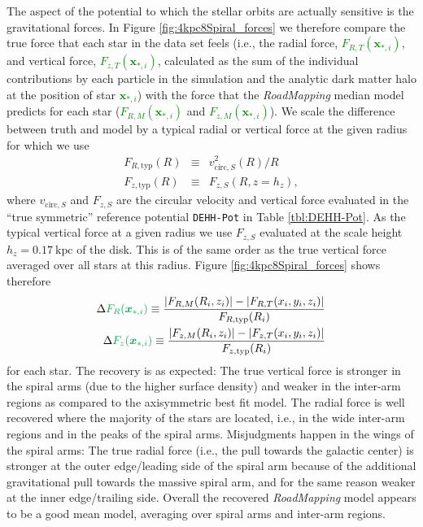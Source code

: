 \documentclass[iop,revtex4,numberedappendix,appendixfloats]{emulateapj}
\newcommand{\vect}[1]{\boldsymbol{#1}}
\newcommand{\RM}{{\sl RoadMapping}}
\newcommand{\NEW}[1]{\textcolor{Green}{#1}}
\newcommand{\OLD}[1]{}
\begin{document}
The aspect of the potential to which the stellar orbits are actually sensitive is the gravitational forces. In Figure \ref{fig:4kpc8Spiral_forces} we therefore compare the true force that each star in the data set feels (i.e., the radial force, \OLD{$F_{R,T}(*_i)$}\NEW{$F_{R,T}(\vect{x}_{*,i})$}, and vertical force, \OLD{$F_{T,M}(*_i)$}\NEW{$F_{z,T}(\vect{x}_{*,i})$}, calculated as the sum of the individual contributions by each particle in the simulation and the analytic dark matter halo at the position of star \OLD{$*_i$}\NEW{$\vect{x}_{*,i}$}) with the force that the \RM{} median model predicts for each star (\OLD{$F_{R,M}(*_i)$}\NEW{$F_{R,M}(\vect{x}_{*,i})$} and \OLD{$F_{z,M}(*_i)$}\NEW{$F_{z,M}(\vect{x}_{*,i})$}). We scale the difference between truth and model by a typical radial or vertical force at the given radius for which we use
\begin{eqnarray}
F_{R,\text{typ}}(R) &\equiv& v^2_{\text{circ},S}(R) / R\\
F_{z,\text{typ}}(R) &\equiv& F_{z,S}(R,z=h_z),
\end{eqnarray}
where $v_{\text{circ},S}$ and $F_{z,S}$ are the circular velocity and vertical force evaluated in the ``true symmetric'' reference potential \texttt{DEHH-Pot} in Table \ref{tbl:DEHH-Pot}. As the typical vertical force at a given radius we use $F_{z,S}$ evaluated at the scale height $h_z=0.17~\text{kpc}$ of the disk. This is of the same order as the true vertical force averaged over all stars at this radius. Figure \ref{fig:4kpc8Spiral_forces} shows therefore
\begin{eqnarray}
\Delta \OLD{F_R(*_i)}\NEW{F_R(\vect{x}_{*,i})} \equiv \frac{|F_{R,M}(R_i,z_i)| - |F_{R,T}(x_i,y_i,z_i)|}{F_{R,\text{typ}}(R_i)}\label{eq:delta_FR}\\
\Delta \OLD{F_z(*_i)}\NEW{F_z(\vect{x}_{*,i})} \equiv \frac{|F_{z,M}(R_i,z_i)| - |F_{z,T}(x_i,y_i,z_i)|}{F_{z,\text{typ}}(R_i)}\label{eq:delta_Fz}
\end{eqnarray}
for each star. The recovery is as expected: The true vertical force is stronger in the spiral arms (due to the higher surface density) and weaker in the inter-arm regions as compared to the axisymmetric best fit model. The radial force is well recovered where the majority of the stars are located, i.e., in the wide inter-arm regions and in the peaks of the spiral arms. Misjudgments happen in the wings of the spiral arms: The true radial force (i.e., the pull towards the galactic center) is stronger at the outer edge/leading side of the spiral arm because of the additional gravitational pull towards the massive spiral arm, and for the same reason weaker at the inner edge/trailing side. Overall the recovered \RM{} model appears to be a good mean model, averaging over spiral arms and inter-arm regions.
\end{document}
